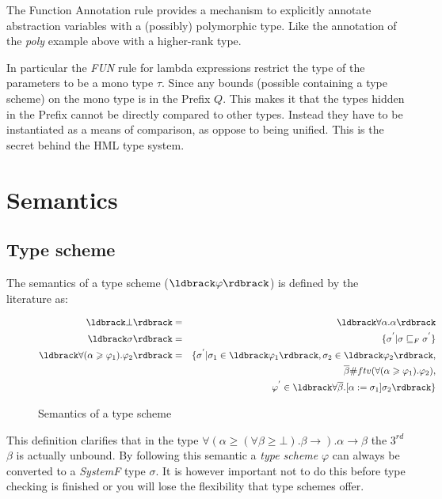 \documentclass[twoside, titlepage, openright, a4paper]{book}
\renewcommand{\geq}{\geqslant}
\newcommand{\br}[1]{\ldbrack #1 \rdbrack}
\begin{document}
The Function Annotation rule provides a mechanism to explicitly annotate abstraction variables with a (possibly) polymorphic type. Like the annotation of the \textit{poly} example above with a higher-rank type.

In particular the \textit{FUN} rule for lambda expressions restrict the type of the parameters to be a mono type $\tau$. Since any bounds (possible containing a type scheme) on the mono type is in the Prefix $Q$. This makes it that the types hidden in the Prefix cannot be directly compared to other types. Instead they have to be instantiated as a means of comparison, as oppose to being unified. This is the secret behind the HML type system.  

\section{Semantics}
\subsection{Type scheme}
The semantics of a type scheme ($\br{\varphi}$) is defined by the literature\cite{HML} as:
\begin{figure}[H]
\begin{eqnarray*}
\br{\bot} & = & \br{\forall\alpha . \alpha} \\
\br{\sigma} & = & \{ \sigma^{'} | \sigma \sqsubseteq_F \sigma^{'} \} \\
\br{\forall(\alpha \geq \varphi_1).\varphi_2} & = & \{ \sigma^{'} | \sigma_1  \in \br{\varphi_1}, \sigma_2 \in \br{\varphi_2}, \\ 
   &\mbox{   }& \mbox{   } \overline{\beta} \# ftv(\forall(\alpha \geq \varphi_1).\varphi_2), \\
   &\mbox{   }& \mbox{   } \varphi^{'} \in \br{\forall\overline{\beta}.\lbrack \alpha := \sigma_1 \rbrack\sigma_2}  \} 
\end{eqnarray*}
\caption{Semantics of a type scheme}
\end{figure}

This definition clarifies that in the type $\forall(\alpha \geq (\forall \beta \geq \bot). \beta \rightarrow ). \alpha \rightarrow \beta$ the $3^{rd}$ $\beta$ is actually unbound. By following this semantic a \emph{type scheme} $\varphi$ can always be converted to a \emph{SystemF} type $\sigma$. It is however important not to do this before type checking is finished or you will lose the flexibility that type schemes offer.
\end{document}
